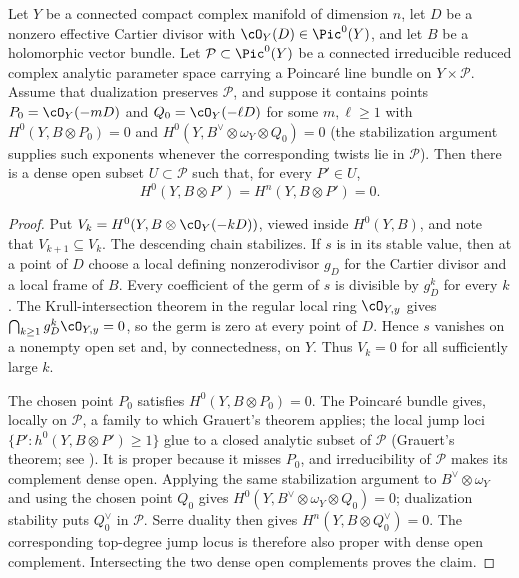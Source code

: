 \begin{lemma}
\label{lem:generic-endpoints}
Let $Y$ be a connected compact complex manifold of dimension $n$, let $D$ be
a nonzero effective Cartier divisor with $\cO_Y(D)\in\Pic^0(Y)$, and let
$B$ be a holomorphic vector bundle.  Let $\mathcal P\subset\Pic^0(Y)$ be a
connected irreducible reduced complex analytic parameter space carrying a
Poincar\'e line bundle on $Y\times\mathcal P$.  Assume that dualization
preserves $\mathcal P$, and suppose it
  contains points $P_0=\cO_Y(-mD)$ and $Q_0=\cO_Y(-\ell D)$ for some
  $m,\ell\ge1$ with
  $H^0(Y,B\otimes P_0)=0$ and
  $H^0(Y,B^\vee\otimes\omega_Y\otimes Q_0)=0$ (the stabilization argument
  supplies such exponents whenever the corresponding twists lie in
  $\mathcal P$).  Then there is a dense open subset
$U\subset\mathcal P$ such that, for every $P'\in U$,
\[
 H^0(Y,B\otimes P')=H^n(Y,B\otimes P')=0.
 \tag{5.2}
\]
\end{lemma}

\begin{proof}
Put
  \(V_k=H^0(Y,B\otimes\cO_Y(-kD))\), viewed inside $H^0(Y,B)$, and note
  that $V_{k+1}\subseteq V_k$.  The descending chain stabilizes.  If $s$ is
  in its stable value, then at a point of $D$ choose a local defining
  nonzerodivisor $g_D$ for the Cartier divisor and a local frame of $B$.
  Every coefficient of the germ of $s$ is divisible by $g_D^k$ for every
  $k$.  The Krull-intersection theorem in the regular local ring
  $\cO_{Y,y}$ gives $\bigcap_{k\ge1}g_D^k\cO_{Y,y}=0$, so the germ is zero at
  every point of $D$.  Hence $s$ vanishes on a nonempty open set and, by
  connectedness, on $Y$.  Thus $V_k=0$ for all sufficiently large $k$.

  The chosen point $P_0$ satisfies
  $H^0(Y,B\otimes P_0)=0$.  The Poincar\'e bundle gives, locally on
$\mathcal P$, a family to which Grauert's theorem applies; the local jump
  loci $\{P':h^0(Y,B\otimes P')\ge1\}$ glue to a closed analytic subset of
  $\mathcal P$ (Grauert's theorem; see \cite{GrRe,BaSt}).  It is proper because it misses $P_0$, and irreducibility of
$\mathcal P$ makes its complement dense open.  Applying the same stabilization
argument to $B^\vee\otimes\omega_Y$ and using the chosen point $Q_0$ gives
$H^0(Y,B^\vee\otimes\omega_Y\otimes Q_0)=0$; dualization stability puts
$Q_0^\vee$ in $\mathcal P$.  Serre duality then gives
$H^n(Y,B\otimes Q_0^\vee)=0$.  The corresponding top-degree jump locus is
therefore also proper with dense open complement.  Intersecting the two
dense open complements proves the claim.
\end{proof}

